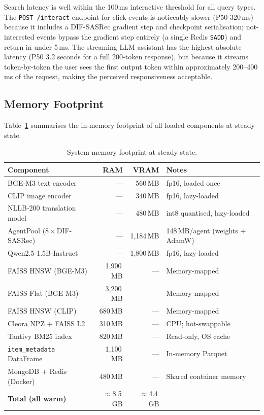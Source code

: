 Search latency is well within the 100\,ms interactive threshold for all query types.
The \texttt{POST /interact} endpoint for click events is noticeably slower (P50 320\,ms) because it includes a DIF-SASRec gradient step and checkpoint serialisation; not-interested events bypass the gradient step entirely (a single Redis \texttt{SADD}) and return in under 5\,ms.
The streaming LLM assistant has the highest absolute latency (P50 3.2 seconds for a full 200-token response), but because it streams token-by-token the user sees the first output token within approximately 200--400\,ms of the request, making the perceived responsiveness acceptable.

\subsection{Memory Footprint}

Table~\ref{tab:memory_footprint} summarises the in-memory footprint of all loaded components at steady state.

\begin{table}[H]
\centering
\caption{System memory footprint at steady state.}
\label{tab:memory_footprint}
\begin{tabular}{p{5.0cm} r r p{4.8cm}}
\hline
\textbf{Component} & \textbf{RAM} & \textbf{VRAM} & \textbf{Notes} \\
\hline
BGE-M3 text encoder          & —           & 560\,MB      & fp16, loaded once \\
CLIP image encoder            & —           & 340\,MB      & fp16, lazy-loaded \\
NLLB-200 translation model    & —           & 480\,MB      & int8 quantised, lazy-loaded \\
AgentPool (8\,$\times$\,DIF-SASRec) & —   & 1{,}184\,MB  & 148\,MB/agent (weights + AdamW) \\
Qwen2.5-1.5B-Instruct        & —           & 1{,}800\,MB  & fp16, lazy-loaded \\
FAISS HNSW (BGE-M3)          & 1{,}900\,MB & —            & Memory-mapped \\
FAISS Flat (BGE-M3)          & 3{,}200\,MB & —            & Memory-mapped \\
FAISS HNSW (CLIP)            & 680\,MB     & —            & Memory-mapped \\
Cleora NPZ + FAISS L2         & 310\,MB     & —            & CPU; hot-swappable \\
Tantivy BM25 index            & 820\,MB     & —            & Read-only, OS cache \\
\texttt{item\_metadata} DataFrame & 1{,}100\,MB & —        & In-memory Parquet \\
MongoDB + Redis (Docker)      & 480\,MB     & —            & Shared container memory \\
\hline
\textbf{Total (all warm)}    & $\approx$8.5\,GB & $\approx$4.4\,GB & \\
\hline
\end{tabular}
\end{table}

